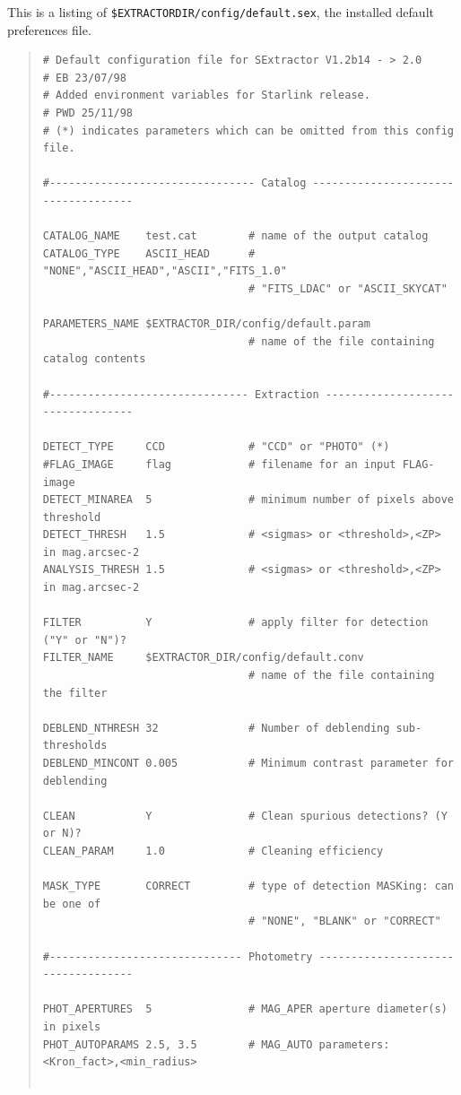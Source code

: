 \documentclass[twoside,11pt]{article}
\renewcommand{\_}{\texttt{\symbol{95}}}
\begin{document}
This is a listing of \texttt{\$EXTRACTOR\_DIR/config/default.sex}, the
installed default preferences file.
\small
\begin{quote} \begin{verbatim}
# Default configuration file for SExtractor V1.2b14 - > 2.0
# EB 23/07/98
# Added environment variables for Starlink release.
# PWD 25/11/98
# (*) indicates parameters which can be omitted from this config file.

#-------------------------------- Catalog ------------------------------------

CATALOG_NAME    test.cat        # name of the output catalog
CATALOG_TYPE    ASCII_HEAD      # "NONE","ASCII_HEAD","ASCII","FITS_1.0"
                                # "FITS_LDAC" or "ASCII_SKYCAT"

PARAMETERS_NAME $EXTRACTOR_DIR/config/default.param
                                # name of the file containing catalog contents

#------------------------------- Extraction ----------------------------------

DETECT_TYPE     CCD             # "CCD" or "PHOTO" (*)
#FLAG_IMAGE     flag            # filename for an input FLAG-image
DETECT_MINAREA  5               # minimum number of pixels above threshold
DETECT_THRESH   1.5             # <sigmas> or <threshold>,<ZP> in mag.arcsec-2
ANALYSIS_THRESH 1.5             # <sigmas> or <threshold>,<ZP> in mag.arcsec-2

FILTER          Y               # apply filter for detection ("Y" or "N")?
FILTER_NAME     $EXTRACTOR_DIR/config/default.conv
                                # name of the file containing the filter

DEBLEND_NTHRESH 32              # Number of deblending sub-thresholds
DEBLEND_MINCONT 0.005           # Minimum contrast parameter for deblending

CLEAN           Y               # Clean spurious detections? (Y or N)?
CLEAN_PARAM     1.0             # Cleaning efficiency

MASK_TYPE       CORRECT         # type of detection MASKing: can be one of
                                # "NONE", "BLANK" or "CORRECT"

#------------------------------ Photometry -----------------------------------

PHOT_APERTURES  5               # MAG_APER aperture diameter(s) in pixels
PHOT_AUTOPARAMS 2.5, 3.5        # MAG_AUTO parameters: <Kron_fact>,<min_radius>


\end{verbatim}
\end{quote}
\end{document}
